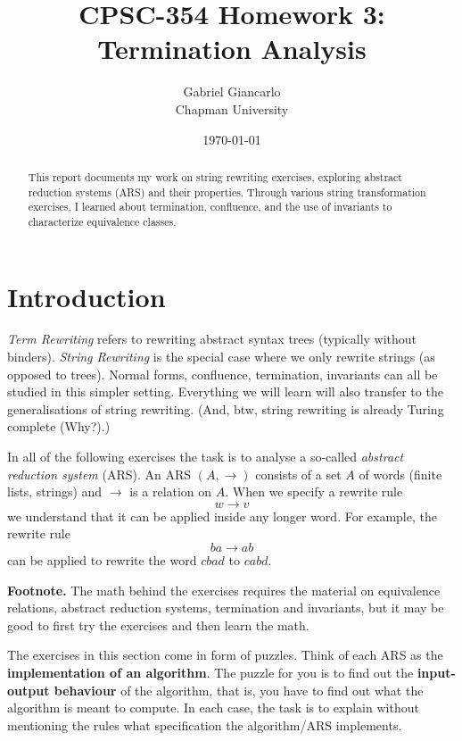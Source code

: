 \documentclass{article}
\title{CPSC-354 Homework 3: Termination Analysis}
\author{Gabriel Giancarlo \\ Chapman University}
\date{\today}
\theoremstyle{plain}
\theoremstyle{definition}
\theoremstyle{remark}
\begin{document}
\maketitle

\begin{abstract}
This report documents my work on string rewriting exercises, exploring abstract reduction systems (ARS) and their properties. Through various string transformation exercises, I learned about termination, confluence, and the use of invariants to characterize equivalence classes.
\end{abstract}

\setcounter{tocdepth}{3}
\tableofcontents

\section{Introduction}\label{intro}

\textit{Term Rewriting} refers to rewriting abstract syntax trees (typically without binders). 
\textit{String Rewriting} is the special case where we only rewrite strings (as opposed to trees). 
Normal forms, confluence, termination, invariants can all be studied in this simpler setting. 
Everything we will learn will also transfer to the generalisations of string rewriting. 
(And, btw, string rewriting is already Turing complete (Why?).)

\bigskip

In all of the following exercises the task is to analyse a so-called \textit{abstract reduction system} (ARS). 
An ARS $(A,\to)$ consists of a set $A$ of words (finite lists, strings) and $\to$ is a relation on $A$. 
When we specify a rewrite rule
\[
w \to v
\]
we understand that it can be applied inside any longer word. 
For example, the rewrite rule
\[
ba \to ab
\]
can be applied to rewrite the word $cbad$ to $cabd$.

\bigskip

\noindent\textbf{Footnote.} 
The math behind the exercises requires the material on equivalence relations, abstract reduction systems, termination and invariants, but it may be good to first try the exercises and then learn the math.

\bigskip

The exercises in this section come in form of puzzles. 
Think of each ARS as the \textbf{implementation of an algorithm}. 
The puzzle for you is to find out the \textbf{input-output behaviour} of the algorithm, that is, you have to find out what the algorithm is meant to compute. 
In each case, the task is to explain without mentioning the rules what specification the algorithm/ARS implements.
\end{document}
